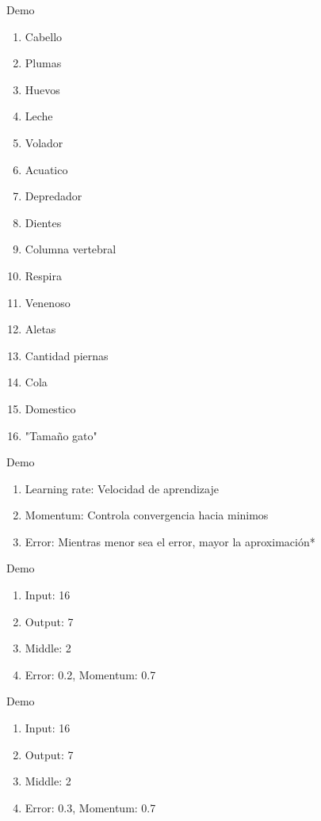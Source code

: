 \documentclass{beamer}
\begin{document}
\begin{frame}{Demo}
    \begin{enumerate}
        \item Cabello
        \item Plumas
        \item Huevos
        \item Leche
        \item Volador
        \item Acuatico
        \item Depredador
        \item Dientes
        \item Columna vertebral
        \item Respira
        \item Venenoso
        \item Aletas
        \item Cantidad piernas
        \item Cola
        \item Domestico
        \item "Tamaño gato"
   \end{enumerate}
\end{frame}

\begin{frame}{Demo}
    \begin{enumerate}
        \item Learning rate: Velocidad de aprendizaje
        \item Momentum: Controla convergencia hacia minimos
        \item Error: Mientras menor sea el error, mayor la aproximación*
    \end{enumerate}
\end{frame}
\begin{frame}{Demo}
\begin{enumerate}
	\item Input: 16
	\item Output: 7
	\item Middle: 2
	\item Error: 0.2, Momentum: 0.7
\end{enumerate}
\end{frame}

\begin{frame}{Demo}
\begin{enumerate}
	\item Input: 16
	\item Output: 7
	\item Middle: 2
	\item Error: 0.3, Momentum: 0.7
\end{enumerate}
\end{frame}
\end{document}
